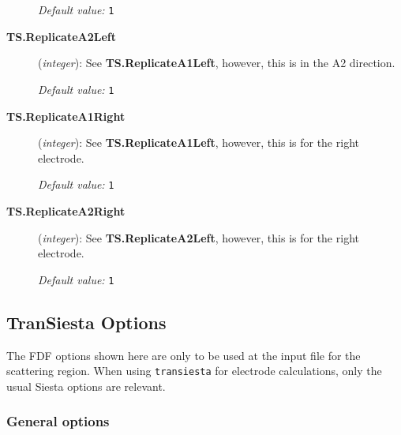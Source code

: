 \documentclass[11pt]{article}
\begin{document}
\begin{description}
  {\it Default value:} {\tt 1}

  \item[{\bf TS.ReplicateA2Left}] ({\it integer}):
   See 
  {\bf TS.ReplicateA1Left}, however, this is in the A2 direction.

  {\it Default value:} {\tt 1}

  \item[{\bf TS.ReplicateA1Right}] ({\it integer}):
   See 
  {\bf TS.ReplicateA1Left}, however, this is for the right electrode.

  {\it Default value:} {\tt 1}

  \item[{\bf TS.ReplicateA2Right}] ({\it integer}):
    See 
  {\bf TS.ReplicateA2Left}, however, this is for the right electrode.

  {\it Default value:} {\tt 1}

\end{description}

\subsection{{\sc TranSiesta} Options}

The FDF options shown here are only to be used at the input file for
the scattering region.  When using {\tt transiesta} for electrode
calculations, only the usual {\sc Siesta} options are relevant.

\subsubsection{General options}
\end{document}
